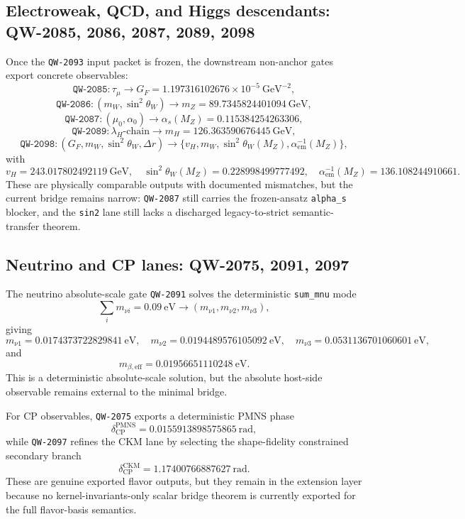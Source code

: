 \documentclass[11pt,a4paper]{article}
\begin{document}
\subsection{Electroweak, QCD, and Higgs descendants: QW-2085, 2086, 2087, 2089, 2098}

Once the \texttt{QW-2093} input packet is frozen, the downstream non-anchor
gates export concrete observables:
\[
\texttt{QW-2085}: \tau_\mu \longrightarrow G_F = 1.197316102676\times 10^{-5}\ \mathrm{GeV}^{-2},
\]
\[
\texttt{QW-2086}: (m_W,\sin^2\theta_W) \longrightarrow m_Z = 89.7345824401094\ \mathrm{GeV},
\]
\[
\texttt{QW-2087}: (\mu_0,\alpha_0) \longrightarrow \alpha_s(M_Z)=0.115384254263306,
\]
\[
\texttt{QW-2089}: \lambda_H\text{-chain} \longrightarrow m_H=126.363590676445\ \mathrm{GeV},
\]
\[
\texttt{QW-2098}: (G_F,m_W,\sin^2\theta_W,\Delta r)
\longrightarrow
\{v_H,m_W,\sin^2\theta_W(M_Z),\alpha_{\mathrm{em}}^{-1}(M_Z)\},
\]
with
\[
v_H=243.017802492119\ \mathrm{GeV},\quad
\sin^2\theta_W(M_Z)=0.228998499777492,\quad
\alpha_{\mathrm{em}}^{-1}(M_Z)=136.108244910661.
\]
These are physically comparable outputs with documented mismatches, but the
current bridge remains narrow: \texttt{QW-2087} still carries the frozen-ansatz
\texttt{alpha\_s} blocker, and the \texttt{sin2} lane still lacks a discharged
legacy-to-strict semantic-transfer theorem.

\subsection{Neutrino and CP lanes: QW-2075, 2091, 2097}

The neutrino absolute-scale gate \texttt{QW-2091} solves the deterministic
\texttt{sum\_mnu} mode
\[
\sum_i m_{\nu i}=0.09\ \mathrm{eV}
\longrightarrow
(m_{\nu 1},m_{\nu 2},m_{\nu 3}),
\]
giving
\[
m_{\nu 1}=0.0174373722829841\ \mathrm{eV},\quad
m_{\nu 2}=0.0194489576105092\ \mathrm{eV},\quad
m_{\nu 3}=0.0531136701060601\ \mathrm{eV},
\]
and
\[
m_{\beta,\mathrm{eff}}=0.01956651110248\ \mathrm{eV}.
\]
This is a deterministic absolute-scale solution, but the absolute host-side
observable remains external to the minimal bridge.

For CP observables, \texttt{QW-2075} exports a deterministic PMNS phase
\[
\delta_{\mathrm{CP}}^{\mathrm{PMNS}} = 0.0155913898575865\ \mathrm{rad},
\]
while \texttt{QW-2097} refines the CKM lane by selecting the shape-fidelity
constrained secondary branch
\[
\delta_{\mathrm{CP}}^{\mathrm{CKM}} = 1.17400766887627\ \mathrm{rad}.
\]
These are genuine exported flavor outputs, but they remain in the extension
layer because no kernel-invariants-only scalar bridge theorem is currently
exported for the full flavor-basis semantics.
\end{document}
